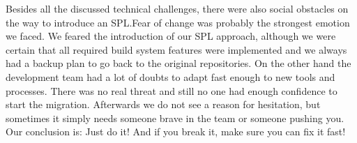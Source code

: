 Besides all the discussed technical challenges, there were also social obstacles
on the way to introduce an SPL.\@ Fear of change was probably the strongest
emotion we faced. We feared the introduction of our SPL approach, although we
were certain that all required build system features were implemented and we
always had a backup plan to go back to the original repositories. On the other
hand the development team had a lot of doubts to adapt fast enough to new tools
and processes. There was no real threat and still no one had enough confidence
to start the migration. Afterwards we do not see a reason for hesitation, but
sometimes it simply needs someone brave in the team or someone pushing you. Our
conclusion is: Just do it! And if you break it, make sure you can fix it fast!
